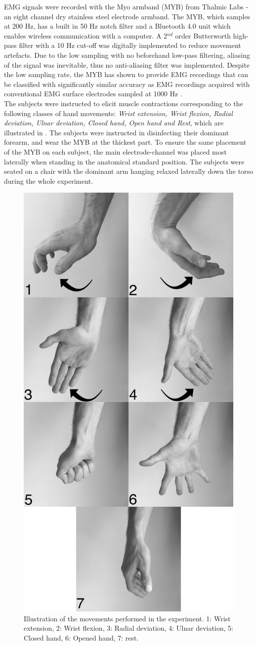 EMG signals were recorded with the Myo armband (MYB) from Thalmic Labs - an eight channel dry stainless steel electrode armband. The MYB, which samples at 200 Hz, has a built in 50 Hz notch filter and a Bluetooth 4.0 unit which enables wireless communication with a computer. A 2$^{nd}$ order Butterworth high-pass filter with a 10 Hz cut-off was digitally implemented to reduce movement artefacts. Due to the low sampling with no beforehand low-pass filtering, aliasing of the signal was inevitable, thus no anti-aliasing filter was implemented. Despite the low sampling rate, the MYB has shown to provide EMG recordings that can be classified with significantly similar accuracy as EMG recordings acquired with conventional EMG surface electrodes sampled at 1000 Hz \cite{Mendez2017}. \\
The subjects were instructed to elicit muscle contractions corresponding to the following classes of hand movements: \textit{Wrist extension, Wrist flexion, Radial deviation, Ulnar deviation, Closed hand, Open hand and Rest}, which are illustrated in . The subjects were instructed in disinfecting their dominant forearm, and wear the MYB at the thickest part. To ensure the same placement of the MYB on each subject, the main electrode-channel was placed most laterally when standing in the anatomical standard position. The subjects were seated on a chair with the dominant arm hanging relaxed laterally down the torso during the whole experiment. \\

\begin{figure}[H]                 
	\includegraphics[width=.4\textwidth]{figures/Paper/allHandMovementsVerticalBW}  
	\caption{Illustration of the movements performed in the experiment. 1: Wrist extension, 2: Wrist flexion, 3: Radial deviation, 4: Ulnar deviation, 5: Closed hand, 6: Opened hand, 7: rest.}
	\label{fig:P:experiment_movements} 
\end{figure}

